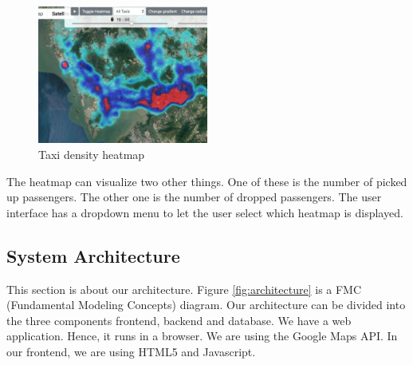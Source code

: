 \documentclass[10pt]{sig-alternate}
\begin{document}
\begin{figure}[ht]
\centering
\includegraphics[width=0.5\textwidth]{img/density.png}
\caption{Taxi density heatmap}
\label{fig:density}
\end{figure}

The heatmap can visualize two other things. One of these is the number of picked up passengers. The other one is the number of dropped passengers. The user interface has a dropdown menu to let the user select which heatmap is displayed.

\subsection{System Architecture}

This section is about our architecture. Figure \ref{fig:architecture} is a FMC (Fundamental Modeling Concepts) diagram. Our architecture can be divided into the three components frontend, backend and database. We have a web application. Hence, it runs in a browser. We are using the Google Maps API. In our frontend, we are using HTML5 and Javascript.\\
\end{document}
